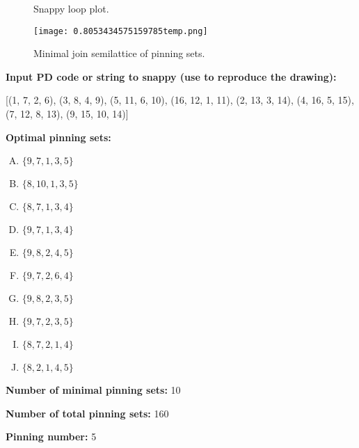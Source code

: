 \documentclass{article}%
\begin{document}
\begin{multicols}{2}
\begin{figure}[H]
\centering

\caption{Snappy loop plot.}
\label{fig:0.21872938185172797temp.svg}
\end{figure}\columnbreak

\begin{figure}[H]
\centering
\texttt{[image: 0.8053434575159785temp.png]}
\caption{Minimal join semilattice of pinning sets.}
\label{fig:0.8053434575159785temp.png}
\end{figure}\end{multicols}\newpage\begin{multicols}{2}

\columnbreak

\noindent\textbf{Input PD code or string to snappy (use to reproduce the drawing):}

	[(1, 7, 2, 6), (3, 8, 4, 9), (5, 11, 6, 10), (16, 12, 1, 11), (2, 13, 3, 14), (4, 16, 5, 15), (7, 12, 8, 13), (9, 15, 10, 14)]

\noindent\textbf{Optimal pinning sets:}

\begin{enumerate}[A)]
\item{\Huge\textcolor{green0}{\textbullet}}$\{9,7,1,3,5\}$

\item{\Huge\textcolor{green1}{\textbullet}}$\{8,10,1,3,5\}$

\item{\Huge\textcolor{green2}{\textbullet}}$\{8,7,1,3,4\}$

\item{\Huge\textcolor{green3}{\textbullet}}$\{9,7,1,3,4\}$

\item{\Huge\textcolor{green4}{\textbullet}}$\{9,8,2,4,5\}$

\item{\Huge\textcolor{green5}{\textbullet}}$\{9,7,2,6,4\}$

\item{\Huge\textcolor{green6}{\textbullet}}$\{9,8,2,3,5\}$

\item{\Huge\textcolor{green7}{\textbullet}}$\{9,7,2,3,5\}$

\item{\Huge\textcolor{green8}{\textbullet}}$\{8,7,2,1,4\}$

\item{\Huge\textcolor{green9}{\textbullet}}$\{8,2,1,4,5\}$

\end{enumerate}


\noindent\textbf{Number of minimal pinning sets:} 10

\noindent\textbf{Number of total pinning sets:} 160

\noindent\textbf{Pinning number:} 5


\end{multicols}
\end{document}
